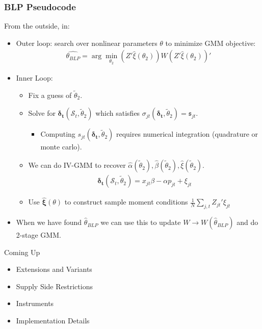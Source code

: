  \begin{frame}
\frametitle{BLP Pseudocode}
\footnotesize
From the outside, in:
\begin{itemize}
\item Outer loop: search over nonlinear parameters $\theta$ to minimize GMM objective:
 \begin{align*}
 \widehat{\theta_{BLP}} = \arg \min_{\theta_2} (Z' \hat{\xi}(\theta_2)) W  (Z' \hat{\xi}(\theta_2))'
 \end{align*}
 \item Inner Loop:
 \begin{itemize}
\item Fix a guess of $\widetilde{\theta}_2$.
\item Solve for $\boldsymbol{\delta_t}(\mathcal{S}_t,\widetilde{\theta}_2)$ which satisfies $\sigma_{jt}(\boldsymbol{\delta_t},\widetilde{\theta}_2) = \mathfrak{s}_{jt}$.
\begin{itemize}
\item Computing $s_{jt}(\boldsymbol{\delta_t},\widetilde{\theta}_2)$ requires numerical integration (quadrature or monte carlo).
\end{itemize}
 \item We can do IV-GMM to recover $\hat{\alpha}(\widetilde{\theta}_2),\hat{\beta}(\widetilde{\theta}_2),\hat{\xi}(\widetilde{\theta}_2)$.
  \begin{align*}
\boldsymbol{\delta_t}(\mathcal{S}_t,\widetilde{\theta}_2)= x_{jt} \beta -\alpha p_{jt}+  \xi_{jt}
 \end{align*}
  \item Use $\boldsymbol{\hat{\xi}}(\theta)$ to construct sample moment conditions $\frac{1}{N} \sum_{j,t} Z_{jt}' \xi_{jt}$
 \end{itemize}
 \item When we have found $\hat{\theta}_{BLP}$ we can use this to update $W \rightarrow W(\hat{\theta}_{BLP})$ and do 2-stage GMM.
 \end{itemize}
\end{frame}

\begin{frame}{Coming Up}
\begin{itemize}
\item Extensions and Variants
\item Supply Side Restrictions
\item Instruments
\item Implementation Details
\end{itemize}

\end{frame}








